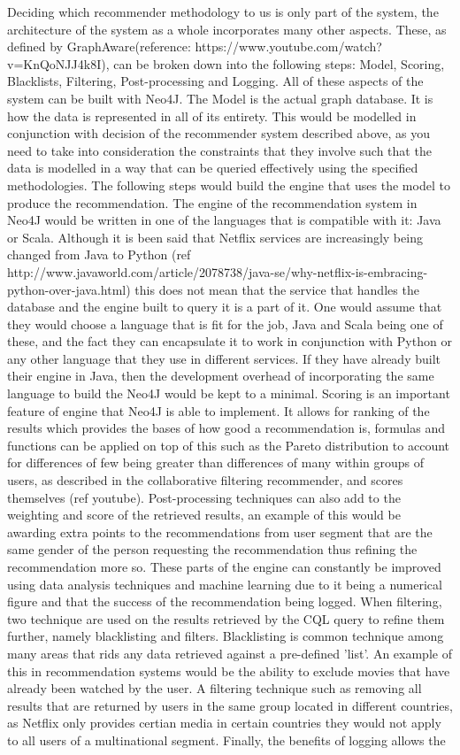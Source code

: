 \documentclass[a4paper]{article}
\begin{document}
Deciding which recommender methodology to us is only part of the system, the architecture of the system as a whole incorporates many other aspects. These, as defined by GraphAware(reference: https://www.youtube.com/watch?v=KnQoNJJ4k8I), can be broken down into the following steps: Model, Scoring, Blacklists, Filtering, Post-processing and Logging. All of these aspects of the system can be built with Neo4J. The Model is the actual graph database. It is how the data is represented in all of its entirety. This would be modelled in conjunction with decision of the recommender system described above, as you need to take into consideration the constraints that they involve such that the data is modelled in a way that can be queried effectively using the specified methodologies. The following steps would build the engine that uses the model to produce the recommendation. The engine of the recommendation system in Neo4J would be written in one of the languages that is compatible with it: Java or Scala. Although it is been said that Netflix services are increasingly being changed from Java to Python (ref http://www.javaworld.com/article/2078738/java-se/why-netflix-is-embracing-python-over-java.html) this does not mean that the service that handles the database and the engine built to query it is a part of it. One would assume that they would choose a language that is fit for the job, Java and Scala being one of these, and the fact they can encapsulate it to work in conjunction with Python or any other language that they use in different services. If they have already built their engine in Java, then the development overhead of incorporating the same language to build the Neo4J would be kept to a minimal. Scoring is an important feature of engine that Neo4J is able to implement. It allows for ranking of the results which provides the bases of how good a recommendation is, formulas and functions can be applied on top of this such as the Pareto distribution to account for differences of few being greater than differences of many within groups of users, as described in the collaborative filtering recommender, and scores themselves (ref youtube). Post-processing techniques can also add to the weighting and score of the retrieved results, an example of this would be awarding extra points to the recommendations from user segment that are the same gender of the person requesting the recommendation thus refining the recommendation more so. These parts of the engine can constantly be improved using data analysis techniques and machine learning due to it being a numerical figure and that the success of the recommendation being logged. When filtering, two technique are used on the results retrieved by the CQL query to refine them further, namely blacklisting and filters. Blacklisting is common technique among many areas that rids any data retrieved against a pre-defined 'list'. An example of this in recommendation systems would be the ability to exclude movies that have already been watched by the user. A filtering technique such as removing all results that are returned by users in the same group located in different countries, as Netflix only provides certian media in certain countries they would not apply to all users of a multinational segment. Finally, the benefits of logging allows the 
\end{document}
